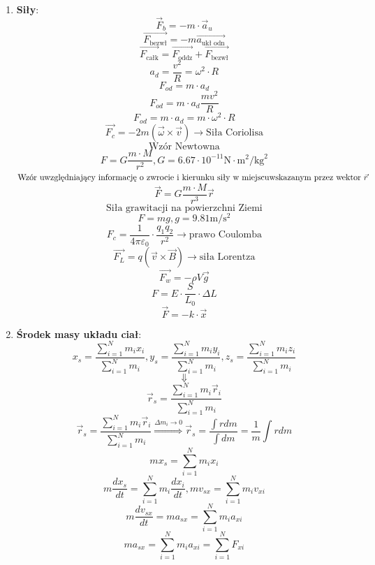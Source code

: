 \documentclass{article}
\begin{document}
\begin{enumerate}
		\item \textbf{Siły}:
		\[
		\vec{F}_b = -m \cdot \vec{a}_u
		\]
		\[
		\overrightarrow{F_{\text{bezwł}}} = -m \overrightarrow{a_{\text{ukł odn}}}
		\]
		\[
		\overrightarrow{F_{\text{całk}}} = \overrightarrow{F_{\text{oddz}}} + \overrightarrow{F_{\text{bezwł}}}
		\]
		\[
		a_d = \frac{v^2}{R} = \omega^2 \cdot R
		\]
		\[
		F_{od} = m \cdot a_d
		\]
		\[
		F_{od} = m \cdot a_d \frac{mv^2}{R}
		\]
		\[
		F_{od} = m \cdot a_d = m \cdot \omega^2 \cdot R
		\]
		\[
		\overrightarrow{F_c} = -2m(\vec{\omega} \times \vec{v}) \longrightarrow \text{Siła Coriolisa}
		\]
		\[
		\text{Wzór Newtowna}
		\]
		\[
		F = G \frac{m \cdot M}{r^2}, G = 6.67 \cdot 10^{-11} \text{N} \cdot \text{m}^2 / \text{kg}^2
		\]
		$
			\text{Wzór uwzględniający informację o zwrocie i kierunku siły w miejscu} 	\newline 
			\text{wskazanym przez wektor } \vec{r}
		$
		\[
		\vec{F} = G \frac{m \cdot M}{r^3} \vec{r}
		\]
		\[
		\text{Siła grawitacji na powierzchni Ziemi}
		\]
		\[
		F = mg, g = 9.81 \text{m} / \text{s}^2 
		\]
		\[
		F_c = \frac{1}{4 \pi \varepsilon_0} \cdot \frac{q_1 q_2}{r^2} \longrightarrow \text{prawo Coulomba}
		\]
		\[
		\overrightarrow{F_L} =  q(\vec{v} \times \vec{B}) \longrightarrow \text{siła Lorentza}
		\]
		\[
		\overrightarrow{F_w} = -\rho V \vec{g}
		\]
		\[
		F = E \cdot \frac{S}{L_0} \cdot \Delta L
		\]
		\[
		\vec{F} = -k \cdot \vec{x}
		\]
		\item \textbf{Środek masy układu ciał}:
		\[
		x_s = \frac{\sum\limits_{i = 1}^N m_ix_i}{\sum\limits_{i = 1}^N m_i},
		y_s = \frac{\sum\limits_{i = 1}^N m_iy_i}{\sum\limits_{i = 1}^N m_i},
		z_s = \frac{\sum\limits_{i = 1}^N m_iz_i}{\sum\limits_{i = 1}^N m_i}
		\]
		\[
		\Downarrow
		\]
		\[
		\vec{r}_s = \frac{\sum\limits_{i = 1}^N m_i \vec{r}_i}{\sum\limits_{i = 1}^N m_i}
		\]
		\[
		\vec{r}_s = \frac{\sum\limits_{i = 1}^N m_i \vec{r}_i}{\sum\limits_{i = 1}^N m_i}
		\overset{\Delta m_i \rightarrow 0}{\Rightarrow}
		 \vec{r}_s = \frac{\int rdm}{\int dm} =
		\frac{1}{m} \int rdm
		\]
		\[
		mx_s = \sum\limits_{i = 1}^N m_i x_i
		\]
		\[
		m \frac{dx_s}{dt} = \sum\limits_{i = 1}^N m_i \frac{dx_i}{dt},
		mv_{sx} = \sum\limits_{i = 1}^N m_i v_{xi}
		\]
		\[
		m \frac{dv_{sx}}{dt} = ma_{sx} = \sum\limits_{i = 1}^N m_i a_{xi}
		\]
		\[
		ma_{sx} = \sum\limits_{i = 1}^N m_i a_{xi} = \sum\limits_{i = 1}^N F_{xi}
\]
\end{enumerate}
\end{document}
